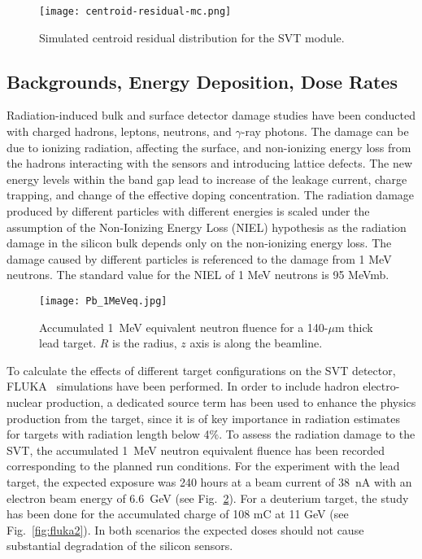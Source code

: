 \begin{figure}[hbt]
\texttt{[image: centroid-residual-mc.png]}
\caption{Simulated centroid residual distribution for the SVT module.}
\label{fig:centroid-residual-mc}
\end{figure}

\subsection{Backgrounds, Energy Deposition, Dose Rates}

Radiation-induced bulk and surface detector damage studies have been conducted with charged hadrons, leptons, neutrons, and $\gamma$-ray photons. The damage can be due to ionizing radiation, affecting the surface, and non-ionizing energy loss from the hadrons interacting with the sensors and introducing lattice defects. The new energy levels within the band gap lead to increase of the leakage current, charge trapping, and change of the effective doping concentration. The radiation damage produced by different particles with different energies is scaled under the assumption of the Non-Ionizing Energy Loss (NIEL) hypothesis as the radiation damage in the silicon bulk depends only on the non-ionizing energy loss. The damage caused by different particles is referenced to the damage from 1 MeV neutrons. The standard value for the NIEL of 1 MeV neutrons is 95 MeVmb. 

\begin{figure}[hbt] 
\centering 
\texttt{[image: Pb\_1MeVeq.jpg]}
\caption{Accumulated 1~MeV equivalent neutron fluence for a 140-$\mu$m thick lead target. $R$ is the radius, $z$ axis is along the beamline.}
\label{fig:fluka1}
\end{figure}

To calculate the effects of different target configurations on the SVT detector,  FLUKA~\cite{FLUKA1, FLUKA2} simulations have been performed. In order to include hadron electro-nuclear production, a dedicated source term has been used to enhance the physics production from the target, since it is of key importance in radiation estimates for targets with radiation length below 4$\%$. To assess the radiation damage to the SVT, the accumulated 1~MeV neutron equivalent fluence has been recorded corresponding to the planned run conditions. For the experiment with the lead target, the expected exposure was 240 hours at a beam current of 38~nA with an electron beam energy of 6.6~GeV (see Fig.~\ref{fig:fluka1}). For a deuterium target, the study has been done for the accumulated charge of 108 mC at 11 GeV (see Fig.~\ref{fig:fluka2}). In both scenarios the expected doses should not cause substantial degradation of the silicon sensors.

